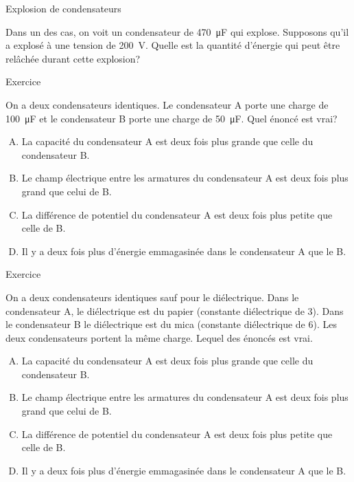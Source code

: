 \documentclass{beamer}
\begin{document}
\begin{frame}{Explosion de condensateurs}

Dans un des cas, on voit un condensateur de \SI{470}{\micro\farad} qui explose.
Supposons qu'il a explosé à une tension de \SI{200}{\volt}. Quelle est la
quantité d'énergie qui peut être relâchée durant cette explosion?

\end{frame}



\begin{frame}{Exercice}

On a deux condensateurs identiques. Le condensateur A porte une charge de
\SI{100}{\micro\farad} et le condensateur B porte une charge de
\SI{50}{\micro\farad}. Quel énoncé est vrai?

\begin{enumerate}[A.]
  \item La capacité du condensateur A est deux fois plus grande que celle du
    condensateur B.
  \item<alert@2> Le champ électrique entre les armatures du condensateur A est
    deux fois plus grand que celui de B.
  \item La différence de potentiel du condensateur A est deux fois plus petite
    que celle de B.
  \item Il y a deux fois plus d'énergie emmagasinée dans le condensateur A que
    le B.
\end{enumerate}

\end{frame}



\begin{frame}{Exercice}

On a deux condensateurs identiques sauf pour le diélectrique. Dans le
condensateur A, le diélectrique est du papier (constante diélectrique de 3).
Dans le condensateur B le diélectrique est du mica (constante diélectrique de
6). Les deux condensateurs portent la même charge. Lequel des énoncés est vrai.

\begin{enumerate}[A.]
  \item La capacité du condensateur A est deux fois plus grande que celle du
    condensateur B.
  \item<alert@2>  Le champ électrique entre les armatures du condensateur A est
    deux fois plus grand que celui de B.
  \item La différence de potentiel du condensateur A est deux fois plus petite
    que celle de B.
  \item Il y a deux fois plus d'énergie emmagasinée dans le condensateur A que
    le B.
\end{enumerate}

\end{frame}
\end{document}
